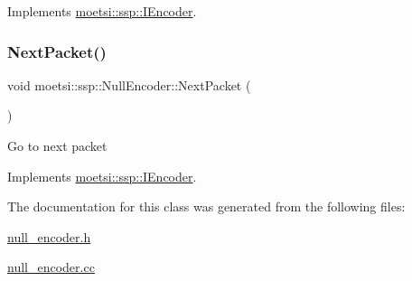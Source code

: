 Implements \hyperlink{classmoetsi_1_1ssp_1_1IEncoder_a2af8e23d841ef61f6ee4037e56a3694d}{moetsi\+::ssp\+::\+I\+Encoder}.

\mbox{\label{classmoetsi_1_1ssp_1_1NullEncoder_a5fe7215f2b462690208b2a144e962e14}} 
\subsubsection{\texorpdfstring{Next\+Packet()}{NextPacket()}}
{\footnotesize\ttfamily void moetsi\+::ssp\+::\+Null\+Encoder\+::\+Next\+Packet (\begin{DoxyParamCaption}{ }\end{DoxyParamCaption})\hspace{0.3cm}{\ttfamily [virtual]}}

Go to next packet 

Implements \hyperlink{classmoetsi_1_1ssp_1_1IEncoder_afac3ddcf2f49be16020c83cb9e0fb274}{moetsi\+::ssp\+::\+I\+Encoder}.



The documentation for this class was generated from the following files\+:\begin{DoxyCompactItemize}
\item 
\hyperlink{null__encoder_8h}{null\+\_\+encoder.\+h}\item 
\hyperlink{null__encoder_8cc}{null\+\_\+encoder.\+cc}\end{DoxyCompactItemize}
